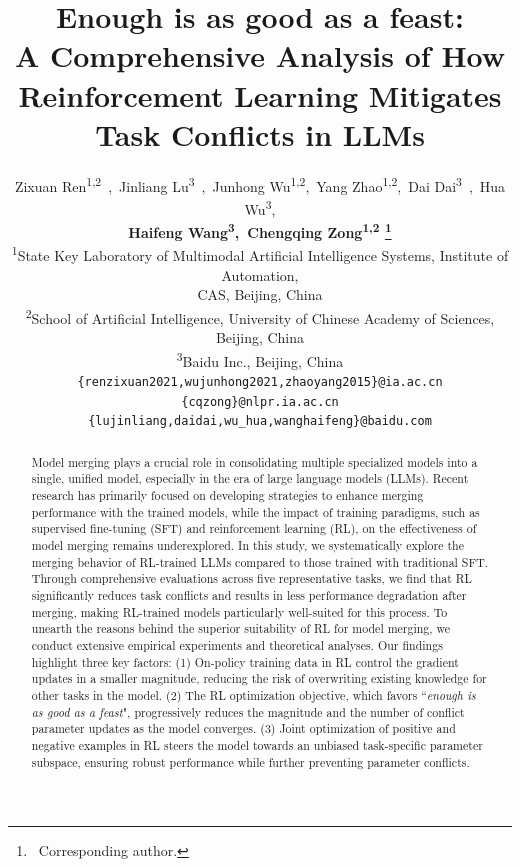 \documentclass{article} %
\title{Enough is as good as a feast: \\A Comprehensive Analysis of How Reinforcement Learning Mitigates Task Conflicts in LLMs}
\author{
Zixuan Ren\textsuperscript{\rm 1,2}\ ,\ Jinliang Lu\textsuperscript{\rm 3}\ ,\ Junhong Wu\textsuperscript{\rm 1,2},\ Yang Zhao\textsuperscript{\rm 1,2},\ Dai Dai\textsuperscript{\rm 3}\ ,\ Hua Wu\textsuperscript{\rm 3},\\ {\bf Haifeng Wang\textsuperscript{\rm 3},\ Chengqing Zong\textsuperscript{\rm 1,2} \thanks{~Corresponding author.}} \\ 
\textsuperscript{\rm 1}State Key Laboratory of Multimodal Artificial Intelligence Systems, Institute of Automation, \\
CAS, Beijing, China \\
\textsuperscript{\rm 2}School of Artificial Intelligence, University of Chinese Academy of Sciences, Beijing, China \\
\textsuperscript{\rm 3}Baidu Inc., Beijing, China \\
\texttt{\textrm{\{}renzixuan2021,wujunhong2021,zhaoyang2015\textrm{\}}@ia.ac.cn}\\
\texttt{\textrm{\{}cqzong\textrm{\}}@nlpr.ia.ac.cn}\\
\texttt{\textrm{\{}lujinliang,daidai,wu\_hua,wanghaifeng\textrm{\}}@baidu.com}\\
}
\begin{document}
\maketitle

\begin{abstract}

Model merging plays a crucial role in consolidating multiple specialized models into a single, unified model, especially in the era of large language models (LLMs). Recent research has primarily focused on developing strategies to enhance merging performance with the trained models, while the impact of training paradigms, such as supervised fine-tuning (SFT) and reinforcement learning (RL), on the effectiveness of model merging remains underexplored.
In this study, we systematically explore the merging behavior of RL-trained LLMs compared to those trained with traditional SFT. Through comprehensive evaluations across five representative tasks, we find that RL significantly reduces task conflicts and results in less performance degradation after merging, making RL-trained models particularly well-suited for this process.
To unearth the reasons behind the superior suitability of RL for model merging, we conduct extensive empirical experiments and theoretical analyses. Our findings highlight three key factors: (1) On-policy training data in RL control the gradient updates in a smaller magnitude, reducing the risk of overwriting existing knowledge for other tasks in the model. (2) The RL optimization objective, which favors ``\textit{enough is as good as a feast}", progressively reduces the magnitude and the number of conflict parameter updates as the model converges. (3) Joint optimization of positive and negative examples in RL steers the model towards an unbiased task-specific parameter subspace, ensuring robust performance while further preventing parameter conflicts. 


\end{abstract}
\end{document}

